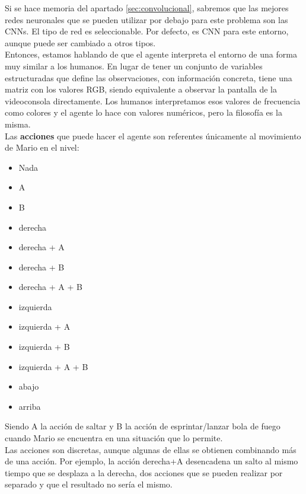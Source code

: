 \documentclass[11pt,fleqn]{book} %
\begin{document}
Si se hace memoria del apartado \ref{sec:convolucional}, sabremos que las mejores redes neuronales que se pueden utilizar por debajo para este problema son las CNNs. El tipo de red es seleccionable. Por defecto, es CNN para este entorno, aunque puede ser cambiado a otros tipos. \\

Entonces, estamos hablando de que el agente interpreta el entorno de una forma muy similar a los humanos. En lugar de tener un conjunto de variables estructuradas que define las observaciones, con información concreta, tiene una matriz con los valores RGB, siendo equivalente a observar la pantalla de la videoconsola directamente. Los humanos interpretamos esos valores de frecuencia como colores y el agente lo hace con valores numéricos, pero la filosofía es la misma. \\

Las \textbf{acciones} que puede hacer el agente son referentes únicamente al movimiento de Mario en el nivel:\\

\begin{itemize}
	\item Nada
	\item A
	\item B
	\item derecha
	\item derecha + A
	\item derecha + B
	\item derecha + A + B
	\item izquierda
	\item izquierda + A
	\item izquierda + B
	\item izquierda + A + B
	\item abajo
	\item arriba\\
\end{itemize}

Siendo A la acción de saltar y B la acción de esprintar/lanzar bola de fuego cuando Mario se encuentra en una situación que lo permite.\\

Las acciones son discretas, aunque algunas de ellas se obtienen combinando más de una acción. Por ejemplo, la acción derecha+A desencadena un salto al mismo tiempo que se desplaza a la derecha, dos acciones que se pueden realizar por separado y que el resultado no sería el mismo. \\
\end{document}
